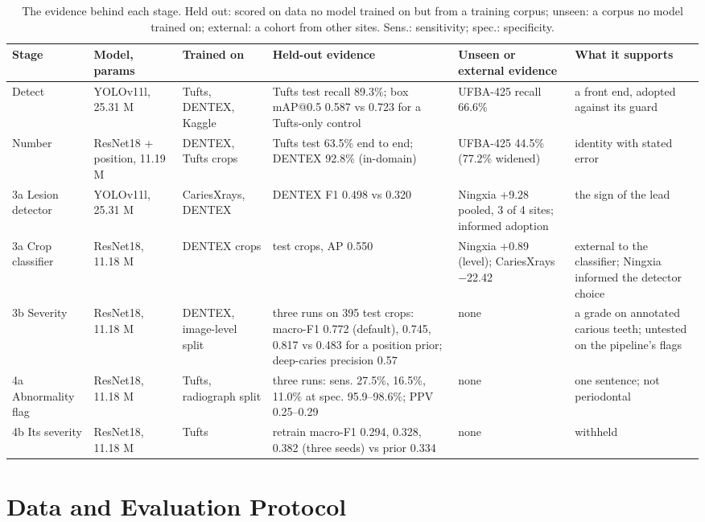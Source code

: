 \documentclass[conference]{IEEEtran}
\begin{document}
\begin{table}[t]
\centering
\caption{The evidence behind each stage. Held out: scored on data no model trained on but from a training corpus; unseen: a corpus no model trained on; external: a cohort from other sites. Sens.: sensitivity; spec.: specificity.}
\label{tab:3}
\footnotesize
\setlength{\tabcolsep}{3pt}
\begin{tabular}{>{\raggedright\arraybackslash}p{1.65cm}>{\raggedright\arraybackslash}p{1.73cm}>{\raggedright\arraybackslash}p{1.65cm}>{\raggedright\arraybackslash}p{5.33cm}>{\raggedright\arraybackslash}p{2.79cm}>{\raggedright\arraybackslash}p{3.36cm}}
\toprule
Stage & Model, params & Trained on & Held-out evidence & Unseen or external evidence & What it supports \\
\midrule
1 Detect & YOLOv11l, 25.31 M & Tufts, DENTEX, Kaggle & Tufts test recall 89.3\%; box mAP@0.5 0.587 vs 0.723 for a Tufts-only control & UFBA-425 recall 66.6\% & a front end, adopted against its guard \\
2 Number & ResNet18 + position, 11.19 M & DENTEX, Tufts crops & Tufts test 63.5\% end to end; DENTEX 92.8\% (in-domain) & UFBA-425 44.5\% (77.2\% widened) & identity with stated error \\
3a Lesion detector & YOLOv11l, 25.31 M & CariesXrays, DENTEX & DENTEX F1 0.498 vs 0.320 & Ningxia +9.28 pooled, 3 of 4 sites; informed adoption & the sign of the lead \\
3a Crop classifier & ResNet18, 11.18 M & DENTEX crops & 863 test crops, AP 0.550 & Ningxia +0.89 (level); CariesXrays $-$22.42 & external to the classifier; Ningxia informed the detector choice \\
3b Severity & ResNet18, 11.18 M & DENTEX, image-level split & three runs on 395 test crops: macro-F1 0.772 (default), 0.745, 0.817 vs 0.483 for a position prior; deep-caries precision 0.57 & none & a grade on annotated carious teeth; untested on the pipeline's flags \\
4a Abnormality flag & ResNet18, 11.18 M & Tufts, radiograph split & three runs: sens. 27.5\%, 16.5\%, 11.0\% at spec. 95.9–98.6\%; PPV 0.25–0.29 & none & one sentence; not periodontal \\
4b Its severity & ResNet18, 11.18 M & Tufts & retrain macro-F1 0.294, 0.328, 0.382 (three seeds) vs prior 0.334 & none & withheld \\
\bottomrule
\end{tabular}
\end{table}

\section{Data and Evaluation Protocol}
\end{document}
